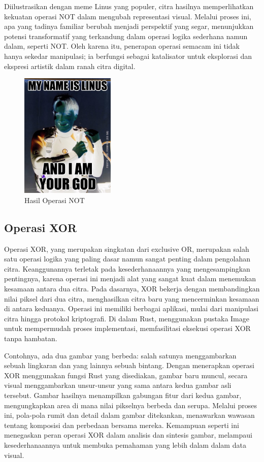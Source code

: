 \documentclass[a4paper,12pt,openany]{book}
\begin{document}
Diilustrasikan dengan meme Linus yang populer, citra hasilnya memperlihatkan kekuatan operasi NOT dalam mengubah representasi visual. Melalui proses ini, apa yang tadinya familiar berubah menjadi perspektif yang segar, menunjukkan potensi transformatif yang terkandung dalam operasi logika sederhana namun dalam, seperti NOT. Oleh karena itu, penerapan operasi semacam ini tidak hanya sekedar manipulasi; ia berfungsi sebagai katalisator untuk eksplorasi dan ekspresi artistik dalam ranah citra digital.


\begin{figure}[H]
    \centering
    \includegraphics[width=0.4\textwidth]{./image/boolean/output-not-operation.png}
    \caption{Hasil Operasi NOT}
\end{figure}

\subsection{Operasi XOR}

Operasi XOR, yang merupakan singkatan dari exclusive OR, merupakan salah satu operasi logika yang paling dasar namun sangat penting dalam pengolahan citra. Keanggunannya terletak pada kesederhanaannya yang mengesampingkan pentingnya, karena operasi ini menjadi alat yang sangat kuat dalam menemukan kesamaan antara dua citra. Pada dasarnya, XOR bekerja dengan membandingkan nilai piksel dari dua citra, menghasilkan citra baru yang mencerminkan kesamaan di antara keduanya. Operasi ini memiliki berbagai aplikasi, mulai dari manipulasi citra hingga protokol kriptografi. Di dalam Rust, menggunakan pustaka Image untuk mempermudah proses implementasi, memfasilitasi eksekusi operasi XOR tanpa hambatan.

Contohnya, ada dua gambar yang berbeda: salah satunya menggambarkan sebuah lingkaran dan yang lainnya sebuah bintang. Dengan menerapkan operasi XOR menggunakan fungsi Rust yang disediakan, gambar baru muncul, secara visual menggambarkan unsur-unsur yang sama antara kedua gambar asli tersebut. Gambar hasilnya menampilkan gabungan fitur dari kedua gambar, mengungkapkan area di mana nilai pikselnya berbeda dan serupa. Melalui proses ini, pola-pola rumit dan detail dalam gambar ditekankan, menawarkan wawasan tentang komposisi dan perbedaan bersama mereka. Kemampuan seperti ini menegaskan peran operasi XOR dalam analisis dan sintesis gambar, melampaui kesederhanaannya untuk membuka pemahaman yang lebih dalam dalam data visual.
\end{document}
